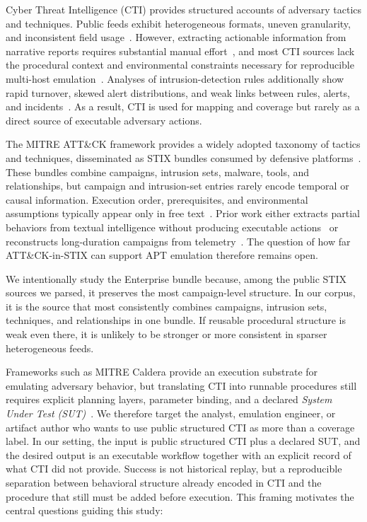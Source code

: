 \documentclass[sigconf]{acmart}
\newcommand{\stix}{STIX\xspace}
\newcommand{\mitre}{MITRE\xspace}
\newcommand{\attack}{ATT\&CK\xspace}
\newcommand{\caldera}{Caldera\xspace}
\begin{document}
Cyber Threat Intelligence (CTI) provides structured accounts of adversary tactics and techniques. Public feeds exhibit heterogeneous formats, uneven granularity, and inconsistent field usage~\cite{jin2024sharing,10117505}. However, extracting actionable information from narrative reports requires substantial manual effort~\cite{savat2021extractor}, and most CTI sources lack the procedural context and environmental constraints necessary for reproducible multi-host emulation~\cite{10117505}. Analyses of intrusion-detection rules additionally show rapid turnover, skewed alert distributions, and weak links between rules, alerts, and incidents~\cite{vermeer2022evolution}. As a result, CTI is used for mapping and coverage but rarely as a direct source of executable adversary actions.

The \mitre{} \attack{} framework provides a widely adopted taxonomy of tactics and techniques, disseminated as \stix{} bundles consumed by defensive platforms~\cite{apurva2024mitre,strom2018mitre,stixspec}. These bundles combine campaigns, intrusion sets, malware, tools, and relationships, but campaign and intrusion-set entries rarely encode temporal or causal information. Execution order, prerequisites, and environmental assumptions typically appear only in free text~\cite{stixspec,10117505,savat2021extractor}. Prior work either extracts partial behaviors from textual intelligence without producing executable actions~\cite{savat2021extractor,xu2024intelex,cheng2025ctinexus} or reconstructs long-duration campaigns from telemetry~\cite{lourenco2024devil,10646725,10646673}. The question of how far \attack{}-in-\stix{} can support APT emulation therefore remains open.

We intentionally study the Enterprise bundle because, among the public \stix{} sources we parsed, it preserves the most campaign-level structure. In our corpus, it is the source that most consistently combines campaigns, intrusion sets, techniques, and relationships in one bundle. If reusable procedural structure is weak even there, it is unlikely to be stronger or more consistent in sparser heterogeneous feeds.

Frameworks such as \mitre{} \caldera{} provide an execution substrate for emulating adversary behavior, but translating CTI into runnable procedures still requires explicit planning layers, parameter binding, and a declared \emph{System Under Test (SUT)}~\cite{wang2024sands,singer2025incalmo}. We therefore target the analyst, emulation engineer, or artifact author who wants to use public structured CTI as more than a coverage label. In our setting, the input is public structured CTI plus a declared SUT, and the desired output is an executable workflow together with an explicit record of what CTI did not provide. Success is not historical replay, but a reproducible separation between behavioral structure already encoded in CTI and the procedure that still must be added before execution. This framing motivates the central questions guiding this study:
\end{document}
